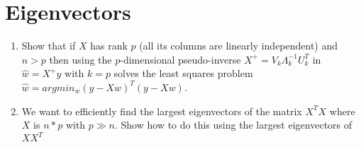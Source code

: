 \section{Eigenvectors}

\begin{enumerate}
\item {} 
Show that if $X$ has rank $p$ (all its columns are linearly independent) and $n > p$ 
then using the $p$-dimensional pseudo-inverse $X^+ = V_k \Lambda_k^{-1} U_k^T$ in $\hat{w} = X^+ y$ with $k=p$
solves the least squares problem
$\hat{w} = argmin_w (y - Xw)^T(y-Xw)$.


\item {} 
We want to efficiently find the largest eigenvectors of the matrix $X^TX$ where  $X$ is $n * p$ with $p \gg n$.
Show how to do this using the largest eigenvectors of $XX^T$


\end{enumerate}

\PointStats
